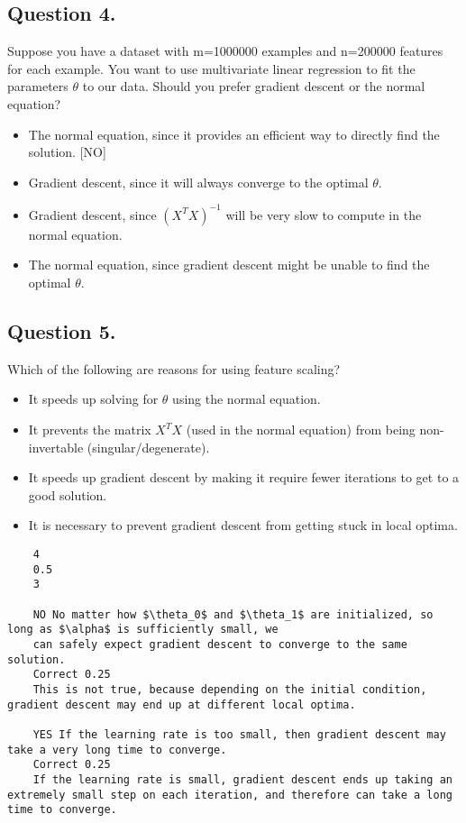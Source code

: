 \documentclass[11pt]{article} %
\begin{document}
	\subsection{Question 4.} 
	Suppose you have a dataset with m=1000000 examples and n=200000 features for each example. You want to use multivariate linear regression to fit the parameters $\theta$ to our data. Should you prefer gradient descent or the normal equation?
	
	
	\begin{itemize}
		\item The normal equation, since it provides an efficient way to directly find the solution. [NO]
		
		\item Gradient descent, since it will always converge to the optimal $\theta$.
		
		\item Gradient descent, since $(X^TX)^{-1}$ will be very slow to compute in the normal equation.
		
		\item The normal equation, since gradient descent might be unable to find the optimal $\theta$.
	\end{itemize}
	\subsection{Question 5.} 
	Which of the following are reasons for using feature scaling?
	
	\begin{itemize}
		\item It speeds up solving for $\theta$ using the normal equation.
		\item It prevents the matrix $X^TX$ (used in the normal equation) from being non-invertable (singular/degenerate).
		\item It speeds up gradient descent by making it require fewer iterations to get to a good solution.
		\item It is necessary to prevent gradient descent from getting stuck in local optima.
	\end{itemize}
	\newpage
	\begin{verbatim}
	4
	0.5
	3
	
	NO No matter how $\theta_0$ and $\theta_1$ are initialized, so long as $\alpha$ is sufficiently small, we 
	can safely expect gradient descent to converge to the same solution.	
	Correct	0.25	
	This is not true, because depending on the initial condition, gradient descent may end up at different local optima.
	
	YES If the learning rate is too small, then gradient descent may take a very long time to converge.	
	Correct	0.25	
	If the learning rate is small, gradient descent ends up taking an extremely small step on each iteration, and therefore can take a long time to converge.
	\end{verbatim}
	
\end{document}
